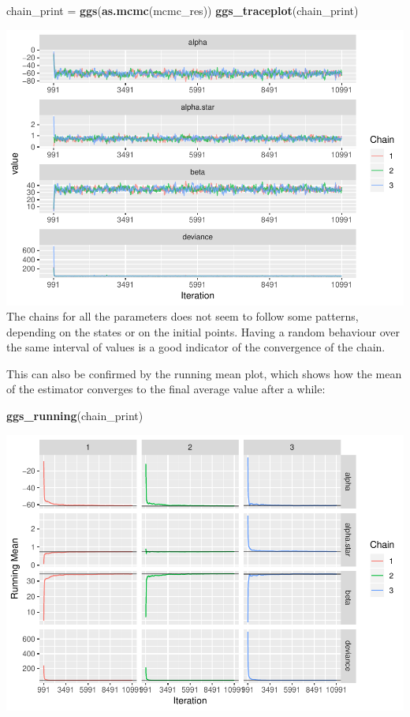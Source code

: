 \documentclass[]{article}
\newenvironment{Shaded}{\begin{snugshade}}{\end{snugshade}}
\newcommand{\KeywordTok}[1]{\textcolor[rgb]{0.13,0.29,0.53}{\textbf{#1}}}
\newcommand{\NormalTok}[1]{#1}
\newcommand{\StringTok}[1]{\textcolor[rgb]{0.31,0.60,0.02}{#1}}
\begin{document}
\begin{Shaded}
\begin{Highlighting}[]
\NormalTok{chain_print =}\StringTok{ }\KeywordTok{ggs}\NormalTok{(}\KeywordTok{as.mcmc}\NormalTok{(mcmc_res))}
\KeywordTok{ggs_traceplot}\NormalTok{(chain_print)}
\end{Highlighting}
\end{Shaded}

\includegraphics{FinalProject-SDSII_files/figure-latex/unnamed-chunk-9-1.pdf}
The chains for all the parameters does not seem to follow some patterns,
depending on the states or on the initial points. Having a random
behaviour over the same interval of values is a good indicator of the
convergence of the chain.

This can also be confirmed by the running mean plot, which shows how the
mean of the estimator converges to the final average value after a
while:

\begin{Shaded}
\begin{Highlighting}[]
\KeywordTok{ggs_running}\NormalTok{(chain_print)}
\end{Highlighting}
\end{Shaded}

\includegraphics{FinalProject-SDSII_files/figure-latex/unnamed-chunk-10-1.pdf}
\end{document}
